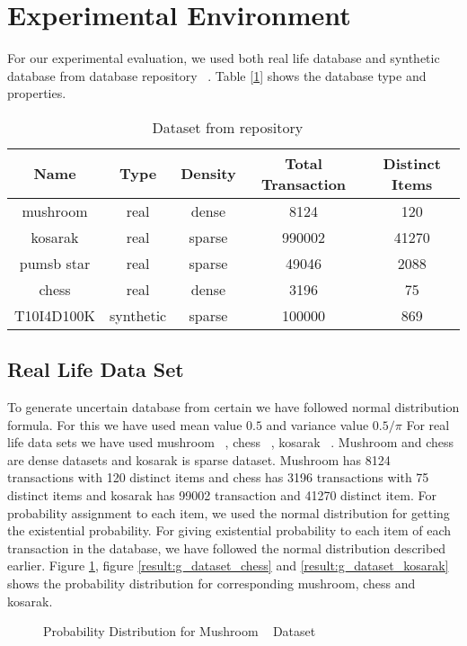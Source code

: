 \section{Experimental Environment}
For our experimental evaluation, we used both real life database and synthetic database from database repository ~\cite{dataset}. Table [\ref{table:dataset}] shows the database type and properties.
        \begin{table}[h]
        \centering
        \begin{tabular}{|c|c|c|c|c|}
        \hline 
        Name        &    Type    &    Density    &    Total Transaction     &    Distinct Items    \\ \hline \hline
        mushroom    &    real    &    dense    &    8124    &    120                            \\ \hline
        kosarak        &    real    &    sparse    &    990002    &    41270                        \\ \hline
        pumsb star    &    real    &    sparse    &    49046    &    2088                        \\ \hline
        chess        &    real    &    dense    &    3196    &    75                            \\ \hline
        T10I4D100K    &    synthetic    &    sparse    &    100000    &    869                        \\ \hline
            \end{tabular}
        \caption{Dataset from repository ~\cite{dataset}}
        \label{table:dataset}
        \end{table}


\subsection{Real Life Data Set}
To generate uncertain database from certain we have followed normal distribution formula. For this we have used mean value $0.5$ and variance value $0.5 / \pi$
For real life data sets we have used mushroom ~\cite{dataset}, chess ~\cite{dataset}, kosarak ~\cite{dataset}. Mushroom and chess are dense datasets and kosarak is sparse dataset. Mushroom has 8124 transactions with 120 distinct items and chess has 3196 transactions with 75 distinct items and kosarak has 99002 transaction and 41270 distinct item. For probability assignment to each item, we used the normal distribution for getting the existential probability. For giving existential probability to each item of each transaction in the database, we have followed the normal distribution described earlier. Figure \ref{result:g_dataset_mushroom}, figure \ref{result:g_dataset_chess} and \ref{result:g_dataset_kosarak} shows the probability distribution for corresponding mushroom, chess and kosarak.
        \begin{figure}[h]
        \centering
            
        \caption{Probability Distribution for Mushroom ~\cite{dataset} Dataset}
        \label{result:g_dataset_mushroom}
        \end{figure}
        
